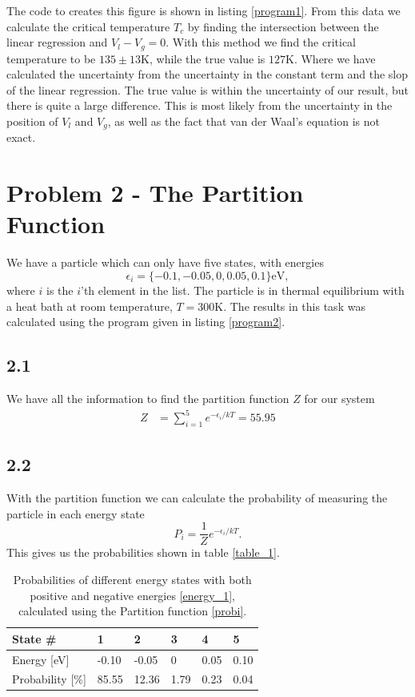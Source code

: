 \documentclass[a4paper,10pt, english]{article}
\begin{document}
The code to creates this figure is shown in listing \vref{program1}.
From this data we calculate the critical temperature $T_c$ by finding the intersection between the linear regression and $V_l-V_g=0$.
With this method we find the critical temperature to be $135\pm13$K, while the true value is $127$K. Where we have calculated the uncertainty from the uncertainty in the constant term and the slop of the linear regression. The true value is within the uncertainty of our result, but there is quite a large difference. This is most likely from the uncertainty in the position of $V_l$ and $V_g$, as well as the fact that van der Waal's equation is not exact.
\section*{Problem 2 - The Partition Function}
We have a particle which can only have five states, with energies
\begin{equation}
    \epsilon_i = \{-0.1, -0.05, 0, 0.05, 0.1\} \text{eV}, \label{energy_1}
\end{equation}
where $i$ is the $i$'th element in the list. The particle is in thermal equilibrium with a heat bath at room temperature, $T=300$K.
The results in this task was calculated using the program given in listing \vref{program2}.
\subsection*{2.1}
We have all the information to find the partition function $Z$ for our system
\begin{align}
    Z &= \sum_{i=1}^{5} e^{-\epsilon_i/kT} = 55.95 \label{party}
\end{align}
\subsection*{2.2}
With the partition function we can calculate the probability of measuring the particle in each energy state
\begin{equation}
    P_i = \frac{1}{Z}e^{-\epsilon_i/kT}.\label{probi}
\end{equation}
This gives us the probabilities shown in table \vref{table_1}.
\begin{table}[]
    \begin{center}
    \caption{Probabilities of different energy states with both positive and negative energies \eqref{energy_1}, calculated using the Partition function \eqref{probi}.}
    \begin{tabular}{@{}llllll@{}}
    \toprule
    State \#                & 1     & 2     & 3    & 4    & 5    \\ \midrule
    Energy {[}eV{]}      & -0.10 & -0.05 & 0    & 0.05 & 0.10 \\
    Probability {[}\%{]} & 85.55 & 12.36 & 1.79 & 0.23 & 0.04 \\ \bottomrule
    \end{tabular}
    \label{table_1}
    \end{center}
\end{table}
\end{document}
